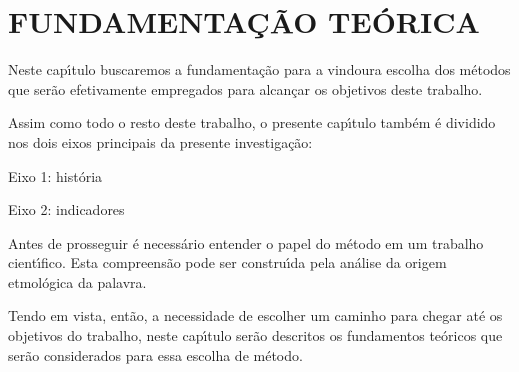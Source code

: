 \documentclass[
12pt,		%
openright,	%
twoside,  %
a4paper,			%
chapter=TITLE,		%
english,			%
french,				%
spanish,			%
brazil				%
]{USPSC-classe/USPSC}
\begin{document}
\chapter[FUNDAMENTA\c{C}\~AO TE\'ORICA ]{FUNDAMENTA\c{C}\~AO TE\'ORICA }\label{FUNDAMENTA\c{C}\~AO TE\'ORICA }
Neste cap\'{\i}tulo buscaremos a fundamenta\c{c}\~ao para a vindoura escolha dos m\'etodos que ser\~ao efetivamente empregados para alcan\c{c}ar os objetivos deste trabalho.










Assim como todo o resto deste trabalho, o presente cap\'{\i}tulo tamb\'em \'e dividido nos dois eixos principais da presente investiga\c{c}\~ao:











\begin{alineas}
\item Eixo 1: hist\'oria
\item Eixo 2: indicadores
\end{alineas}

Antes de prosseguir \'e necess\'ario entender o papel do m\'etodo em um trabalho cient\'{\i}fico. Esta compreens\~ao pode ser constru\'{\i}da pela an\'alise da origem etmol\'ogica da palavra.











\noindent\begin{center}\mbox{\centering{}}\end{center}


Tendo em vista, ent\~ao, a necessidade de escolher um caminho para chegar at\'e os objetivos do trabalho, neste cap\'{\i}tulo ser\~ao descritos os fundamentos te\'oricos que ser\~ao considerados para essa escolha de m\'etodo.
\end{document}
